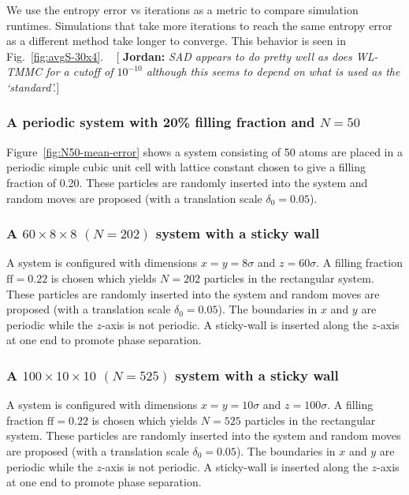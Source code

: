 \documentclass[letterpaper,twocolumn,amsmath,amssymb,pre,aps,10pt]{revtex4-1}
\newcommand{\blue}[1]{{\bf \color{blue} #1}}
\newcommand{\jpsays}[1]{{\color{red} [\blue{Jordan:} \emph{#1}]}}
\begin{document}
We use the entropy error vs iterations as a metric to compare
simulation runtimes.  Simulations that take more iterations to reach
the same entropy error as a different method take longer to converge.
This behavior is seen in Fig.~\ref{fig:avgS-30x4}.
~\jpsays{SAD appears to do pretty well as does WL-TMMC for a cutoff of $10^{-10}$
although this seems to depend on what is used as the `standard'.}

\subsubsection{A periodic system with 20\% filling fraction and $N = 50$}

Figure~\ref{fig:N50-mean-error} shows a system consisting of 50 atoms
are placed in a periodic simple cubic unit cell with lattice constant
chosen to give a filling fraction of 0.20.  These particles are
randomly inserted into the system and random moves are proposed (with
a translation scale $\delta_0 = 0.05$).

\subsubsection{A $60\times8\times8$ $(N = 202)$ system with a sticky
wall}

A system is configured with dimensions $x = y = 8\sigma$ and $z =
60\sigma$.  A filling fraction $\text{ff} = 0.22$ is chosen which
yields $N = 202$ particles in the rectangular system.  These particles
are randomly inserted into the system and random moves are proposed
(with a translation scale $\delta_0 = 0.05$). The boundaries in $x$ and
$y$ are periodic while the $z$-axis is not periodic.  A sticky-wall is
inserted along the $z$-axis at one end to promote phase separation.

\subsubsection{A $100\times10\times10$ $(N = 525)$ system with a sticky
wall}

A system is configured with dimensions $x = y = 10\sigma$ and $z =
100\sigma$.  A filling fraction $\text{ff} = 0.22$ is chosen which
yields $N = 525$ particles in the rectangular system.  These particles
are randomly inserted into the system and random moves are proposed
(with a translation scale $\delta_0 = 0.05$). The boundaries in $x$ and
$y$ are periodic while the $z$-axis is not periodic.  A sticky-wall is
inserted along the $z$-axis at one end to promote phase separation.
\end{document}
